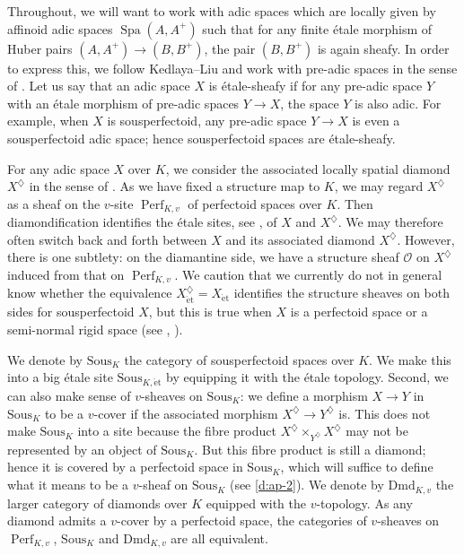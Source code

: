 \documentclass[10pt,a4paper]{article}
\theoremstyle{definition}
\theoremstyle{remark}
\renewcommand{\O}{\mathcal{O}}
\newcommand{\Perf}{\operatorname{Perf}}
\newcommand{\Spa}{\operatorname{Spa}}
\newcommand{\et}{{\operatorname{\acute{e}t}}}
\newcommand{\Sous}{\mathrm{Sous}}
\numberwithin{equation}{section}
\begin{document}
Throughout, we will want to work with adic spaces which are locally given by affinoid adic spaces $\Spa(A,A^+)$ such that for any finite \'etale morphism of Huber pairs $(A,A^+)\to (B,B^+)$, the pair $(B,B^+)$ is again sheafy. In order to express this, we follow Kedlaya--Liu and work with pre-adic spaces in the sense of \cite[Definition~8.2.3]{KedlayaLiu-rel-p-p-adic-Hodge-I}. Let us say that an adic space $X$ is \'etale-sheafy if for any pre-adic space $Y$ with an \'etale morphism of pre-adic spaces $Y\to X$, the space $Y$ is also adic.
For example, when $X$ is sousperfectoid, any pre-adic space $Y\to X$ is even a sousperfectoid adic space; hence sousperfectoid spaces are \'etale-sheafy. 

For any adic space $X$ over $K$, we consider the associated locally spatial diamond $X^\diamondsuit$ in the sense of \cite[Section~15]{etale-cohomology-of-diamonds}.
  As we have fixed a structure map to $K$, we may regard $X^\diamondsuit$ as a sheaf on the $v$-site $\Perf_{K,v}$ of perfectoid spaces over $K$. Then diamondification identifies the \'etale sites, see \cite[Lemma 15.6]{etale-cohomology-of-diamonds}, of $X$ and $X^\diamondsuit$. We may therefore often switch back and forth between $X$ and its associated diamond $X^\diamondsuit$. However,  there is one subtlety: on the diamantine side, we have a structure sheaf $\O$ on $X^\diamondsuit$ induced from that on $\Perf_{K,v}$.  We caution that we currently do not in general know whether the equivalence $X^\diamondsuit_\et=X_\et$ identifies the structure sheaves on both sides for sousperfectoid $X$, but this is true when $X$ is a perfectoid space or a semi-normal rigid space (see \cite[Theorem 8.7]{etale-cohomology-of-diamonds}, \cite[Proposition 10.2.3]{ScholzeBerkeleyLectureNotes}).

  We denote by $\Sous_{K}$  the category of sousperfectoid spaces over $K$.  We make this into a big \'etale site $\Sous_{K,\et}$ by equipping it with the \'etale topology. Second, we can also make sense of $v$-sheaves on $\Sous_{K}$: we define a morphism $X\to Y$ in $\Sous_{K}$ to be a $v$-cover if the associated morphism $X^\diamondsuit\to Y^\diamondsuit$ is. This does not make $\Sous_{K}$ into a site because the fibre product $X^\diamondsuit\times_{Y^\diamondsuit}X^\diamondsuit$ may not be represented by an object of $\Sous_{K}$. But this fibre product is still a diamond; hence it is covered by a perfectoid space in $\Sous_{K}$, which will suffice to define what it means to be a $v$-sheaf on $\Sous_{K}$ (see \eqref{d:ap-2}). We denote by $\mathrm{Dmd}_{K,v}$ the larger category of diamonds over $K$ equipped with the $v$-topology. As any diamond admits a $v$-cover by a perfectoid space, the categories of $v$-sheaves on $\Perf_{K,v}$, $\Sous_{K}$ and $\mathrm{Dmd}_{K,v}$ are all equivalent.
\end{document}
